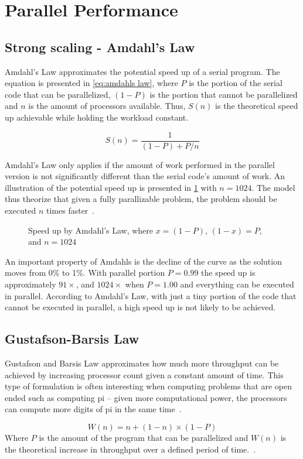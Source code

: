 \section{Parallel Performance}
\label{sec:parallel performance}
\subsection{Strong scaling - Amdahl's Law}
\label{sec:amdahls law}

Amdahl's Law approximates the potential speed up of a serial program.
The equation is presented in \cref{eq:amdahls law}, where $P$ is the portion of the serial code that can be parallelized, $(1-P)$ is the portion that cannot be parallelized and $n$ is the amount of processors available.
Thus, $S(n)$ is the theoretical speed up achievable while holding the workload constant.

\begin{equation}
  \label{eq:amdahls law}
  S(n) = \frac{1}{(1-P) + P/n}
\end{equation}

Amdahl's Law only applies if the amount of work performed in the parallel version is not significantly different than the serial code's amount of work.
An illustration of the potential speed up is presented in \cref{fig:amdahls law} with $n=1024$.
The model thus theorize that given a fully parallizable problem, the problem should be executed $n$ times faster~\cite{farber2011cuda}.

\begin{figure}[htb]
  \centering
  
  \caption{Speed up by Amdahl's Law, where $x=(1-P)$, $(1-x)=P$, and $n=1024$}
  \label{fig:amdahls law}
\end{figure}

An important property of Amdahls is the decline of the curve as the solution moves from 0\% to 1\%.
With parallel portion $P=0.99$ the speed up is approximately $91\times$, and $1024\times$ when $P=1.00$ and everything can be executed in parallel.
According to Amdahl's Law, with just a tiny portion of the code that cannot be executed in parallel, a high speed up is not likely to be achieved.

\subsection{Gustafson-Barsis Law}
\label{sec:gustafson-barsis law}

Gustafson and Barsis Law approximates how much more throughput can be achieved by increasing processor count given a constant amount of time.
This type of formulation is often interesting when computing problems that are open ended such as computing pi -- given more computational power, the processors can compute more digits of pi in the same time~\cite{amdahlorgustafson2011}.

\begin{equation}
  \label{eq:gustafson-barsis law}
  W(n) = n + (1-n) \times (1-P)
\end{equation}
Where $P$ is the amount of the program that can be parallelized and $W(n)$ is the theoretical increase in throughput over a defined period of time.~\cite{gustafson1988reevaluating}.

